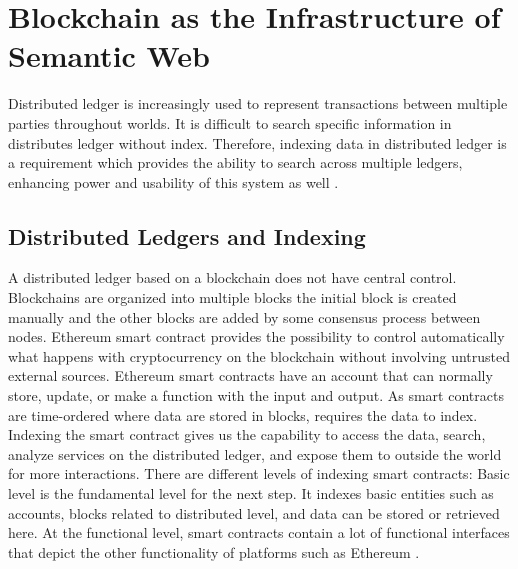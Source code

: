 \chapter{Blockchain as the Infrastructure of Semantic Web}
Distributed ledger is increasingly used to represent transactions between multiple parties throughout worlds. It is difficult to search specific information in distributes ledger without index. Therefore, indexing data in distributed ledger is a requirement which provides the ability to search across multiple ledgers, enhancing power and usability of this system as well \cite{Third}.
\section{Distributed Ledgers and Indexing}
A distributed ledger based on a blockchain does not have central control. Blockchains are organized into multiple blocks the initial block is created manually and the other blocks are added by some consensus process between nodes.
Ethereum smart contract provides the possibility to control automatically what happens with cryptocurrency on the blockchain without involving untrusted external sources. Ethereum smart contracts have an account that can normally store, update, or make a function with the input and output.
As smart contracts are time-ordered where data are stored in blocks,  requires the data to index. Indexing the smart contract gives us the capability to access the data, search, analyze services on the distributed ledger, and expose them to outside the world for more interactions.
There are different levels of indexing smart contracts: Basic level is the fundamental level for the next step. It indexes basic entities such as accounts, blocks related to distributed level, and data can be stored or retrieved here. At the functional level, smart contracts contain a lot of functional interfaces that depict the other functionality of platforms such as Ethereum \cite{Third}. 

